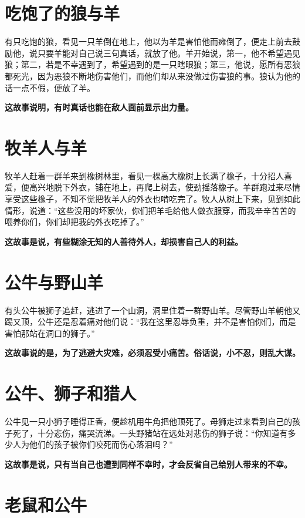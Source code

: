 \section{吃饱了的狼与羊}

有只吃饱的狼，看见一只羊倒在地上，他以为羊是害怕他而瘫倒了，便走上前去鼓励他，说只要羊能对自己说三句真话，就放了他。羊开始说，第一，他不希望遇见狼；第二，若是不幸遇到了，希望遇到的是一只瞎眼狼；第三，他说，愿所有恶狼都死光，因为恶狼不断地伤害他们，而他们却从来没做过伤害狼的事。狼认为他的话一点不假，便放了羊。

{\bfseries \color{red}这故事说明，有时真话也能在敌人面前显示出力量。}

\section{牧羊人与羊}

牧羊人赶着一群羊来到橡树林里，看见一棵高大橡树上长满了橡子，十分招人喜爱，便高兴地脱下外衣，铺在地上，再爬上树去，使劲摇落橡子。羊群跑过来尽情享受这些橡子，不知不觉把牧羊人的外衣也啃吃完了。牧人从树上下来，见到如此情形，说道：“这些没用的坏家伙，你们把羊毛给他人做衣服穿，而我辛辛苦苦的喂养你们，你们却把我的外衣吃掉了。”

{\bfseries \color{red}这故事是说，有些糊涂无知的人善待外人，却损害自己人的利益。}

\section{公牛与野山羊}

有头公牛被狮子追赶，逃进了一个山洞，洞里住着一群野山羊。尽管野山羊朝他又踢又顶，公牛还是忍着痛对他们说：“我在这里忍辱负重，并不是害怕你们，而是害怕那站在洞口的狮子。”

{\bfseries \color{red}这故事说的是，为了逃避大灾难，必须忍受小痛苦。俗话说，小不忍，则乱大谋。}

\section{公牛、狮子和猎人}

公牛见一只小狮子睡得正香，便趁机用牛角把他顶死了。母狮走过来看到自己的孩子死了，十分悲伤，痛哭流涕。一头野猪站在远处对悲伤的狮子说：“你知道有多少人为他们的孩子被你们咬死而伤心落泪吗？”

{\bfseries \color{red}这故事是说，只有当自己也遭到同样不幸时，才会反省自己给别人带来的不幸。}

\section{老鼠和公牛}



